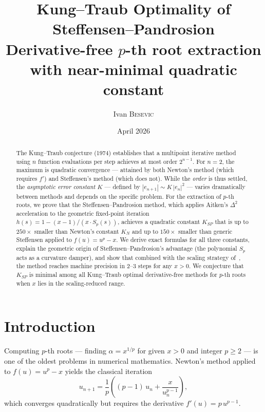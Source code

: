 \documentclass[11pt,a4paper]{article}
\title{\textbf{Kung--Traub Optimality of Steffensen--Pandrosion}\\[0.3em]
  \large Derivative-free $p$-th root extraction with near-minimal
  quadratic constant}
\author{Ivan \textsc{Besevic}}
\date{April 2026}
\theoremstyle{definition}
\begin{document}
\maketitle

\begin{abstract}
The Kung--Traub conjecture (1974) establishes that a multipoint iterative method using $n$ function evaluations per step achieves at most order $2^{n-1}$.  For $n=2$, the maximum is quadratic convergence --- attained by both Newton's method (which requires $f'$) and Steffensen's method (which does not).  While the \emph{order} is thus settled, the \emph{asymptotic error constant} $K$ --- defined by $|e_{n+1}| \sim K\,|e_n|^2$ --- varies dramatically between methods and depends on the specific problem.  For the extraction of $p$-th roots, we prove that the Steffensen--Pandrosion method, which applies Aitken's $\Delta^2$ acceleration to the geometric fixed-point iteration $h(s) = 1 - (x-1)/(x\cdot S_p(s))$, achieves a quadratic constant $K_{SP}$ that is up to $250\times$ smaller than Newton's constant $K_N$ and up to $150\times$ smaller than generic Steffensen applied to $f(u) = u^p - x$.  We derive exact formulas for all three constants, explain the geometric origin of Steffensen--Pandrosion's advantage (the polynomial $S_p$ acts as a curvature damper), and show that combined with the scaling strategy of~\cite{besevic2026}, the method reaches machine precision in $2$--$3$ steps for any $x > 0$.  We conjecture that $K_{SP}$ is minimal among all Kung--Traub optimal derivative-free methods for $p$-th roots when $x$ lies in the scaling-reduced range.
\end{abstract}

\tableofcontents
\bigskip

\section{Introduction}

Computing $p$-th roots --- finding $\alpha = x^{1/p}$ for given $x > 0$ and integer $p \geq 2$ --- is one of the oldest problems in numerical mathematics.  Newton's method applied to $f(u) = u^p - x$ yields the classical iteration
\begin{equation}
  \label{eq:newton}
  u_{n+1} = \frac{1}{p}\left((p-1)\,u_n + \frac{x}{u_n^{p-1}}\right),
\end{equation}
which converges quadratically but requires the derivative $f'(u) = p\,u^{p-1}$.
\end{document}
